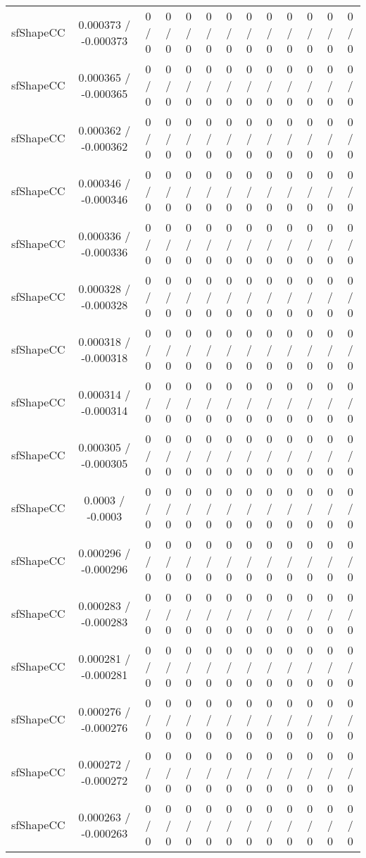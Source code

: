 \documentclass[10pt]{article}
\begin{document}
\begin{table}[htbp]
\begin{center}
\begin{tabular}{|c|c|c|c|c|c|c|c|c|c|c|c|c|}
  sfShapeCC & 0.000373 / -0.000373 & 0 / 0 & 0 / 0 & 0 / 0 & 0 / 0 & 0 / 0 & 0 / 0 & 0 / 0 & 0 / 0 & 0 / 0 & 0 / 0 & 0 / 0 \\ 
  sfShapeCC & 0.000365 / -0.000365 & 0 / 0 & 0 / 0 & 0 / 0 & 0 / 0 & 0 / 0 & 0 / 0 & 0 / 0 & 0 / 0 & 0 / 0 & 0 / 0 & 0 / 0 \\ 
  sfShapeCC & 0.000362 / -0.000362 & 0 / 0 & 0 / 0 & 0 / 0 & 0 / 0 & 0 / 0 & 0 / 0 & 0 / 0 & 0 / 0 & 0 / 0 & 0 / 0 & 0 / 0 \\ 
  sfShapeCC & 0.000346 / -0.000346 & 0 / 0 & 0 / 0 & 0 / 0 & 0 / 0 & 0 / 0 & 0 / 0 & 0 / 0 & 0 / 0 & 0 / 0 & 0 / 0 & 0 / 0 \\ 
  sfShapeCC & 0.000336 / -0.000336 & 0 / 0 & 0 / 0 & 0 / 0 & 0 / 0 & 0 / 0 & 0 / 0 & 0 / 0 & 0 / 0 & 0 / 0 & 0 / 0 & 0 / 0 \\ 
  sfShapeCC & 0.000328 / -0.000328 & 0 / 0 & 0 / 0 & 0 / 0 & 0 / 0 & 0 / 0 & 0 / 0 & 0 / 0 & 0 / 0 & 0 / 0 & 0 / 0 & 0 / 0 \\ 
  sfShapeCC & 0.000318 / -0.000318 & 0 / 0 & 0 / 0 & 0 / 0 & 0 / 0 & 0 / 0 & 0 / 0 & 0 / 0 & 0 / 0 & 0 / 0 & 0 / 0 & 0 / 0 \\ 
  sfShapeCC & 0.000314 / -0.000314 & 0 / 0 & 0 / 0 & 0 / 0 & 0 / 0 & 0 / 0 & 0 / 0 & 0 / 0 & 0 / 0 & 0 / 0 & 0 / 0 & 0 / 0 \\ 
  sfShapeCC & 0.000305 / -0.000305 & 0 / 0 & 0 / 0 & 0 / 0 & 0 / 0 & 0 / 0 & 0 / 0 & 0 / 0 & 0 / 0 & 0 / 0 & 0 / 0 & 0 / 0 \\ 
  sfShapeCC & 0.0003 / -0.0003 & 0 / 0 & 0 / 0 & 0 / 0 & 0 / 0 & 0 / 0 & 0 / 0 & 0 / 0 & 0 / 0 & 0 / 0 & 0 / 0 & 0 / 0 \\ 
  sfShapeCC & 0.000296 / -0.000296 & 0 / 0 & 0 / 0 & 0 / 0 & 0 / 0 & 0 / 0 & 0 / 0 & 0 / 0 & 0 / 0 & 0 / 0 & 0 / 0 & 0 / 0 \\ 
  sfShapeCC & 0.000283 / -0.000283 & 0 / 0 & 0 / 0 & 0 / 0 & 0 / 0 & 0 / 0 & 0 / 0 & 0 / 0 & 0 / 0 & 0 / 0 & 0 / 0 & 0 / 0 \\ 
  sfShapeCC & 0.000281 / -0.000281 & 0 / 0 & 0 / 0 & 0 / 0 & 0 / 0 & 0 / 0 & 0 / 0 & 0 / 0 & 0 / 0 & 0 / 0 & 0 / 0 & 0 / 0 \\ 
  sfShapeCC & 0.000276 / -0.000276 & 0 / 0 & 0 / 0 & 0 / 0 & 0 / 0 & 0 / 0 & 0 / 0 & 0 / 0 & 0 / 0 & 0 / 0 & 0 / 0 & 0 / 0 \\ 
  sfShapeCC & 0.000272 / -0.000272 & 0 / 0 & 0 / 0 & 0 / 0 & 0 / 0 & 0 / 0 & 0 / 0 & 0 / 0 & 0 / 0 & 0 / 0 & 0 / 0 & 0 / 0 \\ 
  sfShapeCC & 0.000263 / -0.000263 & 0 / 0 & 0 / 0 & 0 / 0 & 0 / 0 & 0 / 0 & 0 / 0 & 0 / 0 & 0 / 0 & 0 / 0 & 0 / 0 & 0 / 0 \\ 

\end{tabular}
\end{center}
\end{table}
\end{document}
